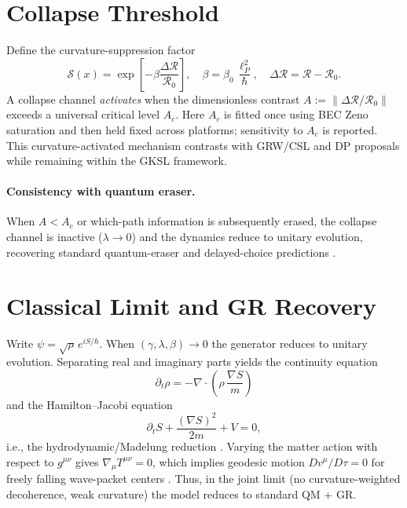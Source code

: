 \documentclass[aps,prl,twocolumn,nofootinbib]{revtex4-2}
\begin{document}
\section{Collapse Threshold}

Define the curvature-suppression factor
\begin{equation}
\mathcal{S}(x)=\exp\!\left[-\beta \frac{\Delta\mathcal{R}}{\mathcal{R}_0}\right],
\quad \beta=\beta_0\,\frac{\ell_P^2}{\hbar}, \quad
\Delta\mathcal{R}=\mathcal{R}-\mathcal{R}_0.
\end{equation}
A collapse channel \emph{activates} when the dimensionless contrast
$A:=\|\Delta\mathcal{R}/\mathcal{R}_0\|$ exceeds a universal critical level $A_c$.
Here $A_c$ is fitted once using BEC Zeno saturation and then held fixed across platforms; sensitivity to $A_c$ is reported.
This curvature-activated mechanism contrasts with GRW/CSL and DP proposals \cite{GRW1986,Pearle1989,BassiRMP2013,Diosi1989,Penrose1996,Penrose2014} while remaining within the GKSL framework.

\paragraph*{Consistency with quantum eraser.}
When $A<A_c$ or which-path information is subsequently erased, the collapse channel is inactive ($\lambda\!\to\!0$) and the dynamics reduce to unitary evolution, recovering standard quantum-eraser and delayed-choice predictions \cite{ScullyDruhl1982,Kim2000,Walborn2002,Jacques2007}.

\section{Classical Limit and GR Recovery}

Write $\psi=\sqrt{\rho}\,e^{iS/\hbar}$. When $(\gamma,\lambda,\beta)\to 0$ the generator reduces to unitary evolution.
Separating real and imaginary parts yields the continuity equation
\begin{equation}
\partial_t\rho = -\nabla\!\cdot\!\left(\rho\,\frac{\nabla S}{m}\right)
\end{equation}
and the Hamilton--Jacobi equation
\begin{equation}
\partial_t S + \frac{(\nabla S)^2}{2m} + V = 0,
\end{equation}
i.e., the hydrodynamic/Madelung reduction \cite{Madelung1927}. Varying the matter action with respect to $g^{\mu\nu}$ gives $\nabla_\mu T^{\mu\nu}=0$, which implies geodesic motion
$Dv^\mu/D\tau=0$ for freely falling wave-packet centers \cite{WaldGR}. Thus, in the joint limit (no curvature-weighted decoherence, weak curvature) the model reduces to standard QM + GR.
\end{document}
